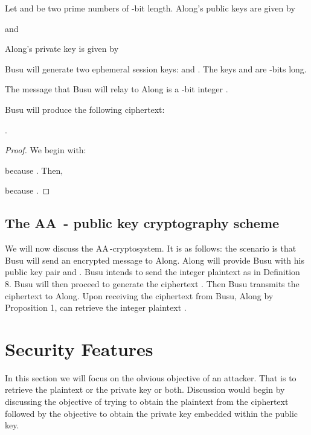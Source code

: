 \documentclass{llncs}
\begin{document}
\begin{definition}
Let  and  be two prime numbers of -bit length. Along's
public keys are given by

and

\end{definition}

\begin{definition}
Along's private key is given by


\end{definition}

\begin{definition}
Busu will generate two ephemeral session keys:  and
. The keys  and  are -bits long.
\end{definition}

\begin{definition}
The message that Busu will relay to Along is a
-bit integer .
\end{definition}

\begin{definition}
Busu will produce the following ciphertext:

\end{definition}

\begin{proposition}
.
\end{proposition}

\begin{proof}
We begin with:

because . Then,

because .
\end{proof}

\subsection{The AA\, - public key cryptography scheme}
We will now discuss the AA\,-cryptosystem. It is as
follows: the scenario is that Busu will send an encrypted message
to Along. Along will provide Busu with his public key pair
 and . Busu intends to send the integer plaintext
 as in Definition 8. Busu will then proceed to generate the
ciphertext . Then Busu transmits the ciphertext  to Along.
Upon receiving the ciphertext from Busu, Along by Proposition 1,
can retrieve the integer plaintext .

\section{Security Features}
In this section we will focus on the obvious objective of an
attacker. That is to retrieve the plaintext or the private key or
both. Discussion would begin by discussing the objective of trying
to obtain the plaintext from the ciphertext followed by the
objective to obtain the private key embedded within the public
key.
\end{document}
